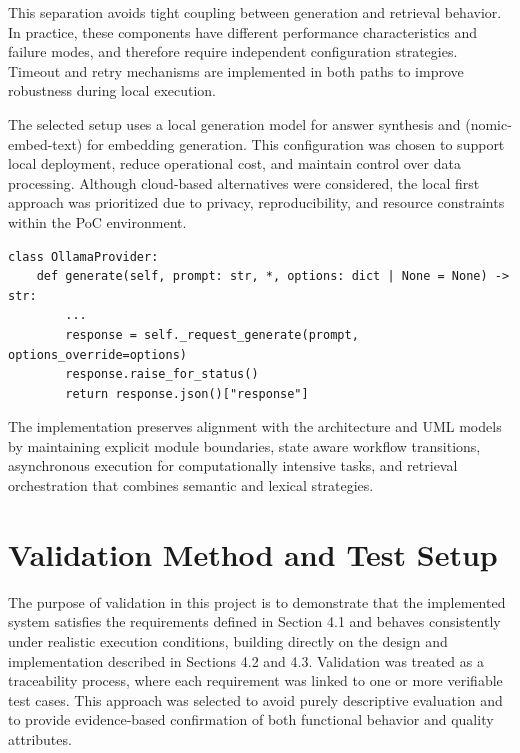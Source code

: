 \vspace{0.4cm}

This separation avoids tight coupling between generation and retrieval behavior.  
In practice, these components have different performance characteristics and failure modes, and therefore require independent configuration strategies.
Timeout and retry mechanisms are implemented in both paths to improve robustness during local execution.

\vspace{0.4cm}

The selected setup uses a local generation model for answer synthesis and (nomic-embed-text) for embedding generation.
This configuration was chosen to support local deployment, reduce operational cost, and maintain control over data processing.  
Although cloud-based alternatives were considered, the local first approach was prioritized due to privacy, reproducibility, and resource constraints within the PoC environment.

\begin{listing}[H]
\begin{verbatim}
class OllamaProvider:
    def generate(self, prompt: str, *, options: dict | None = None) -> str:
        ...
        response = self._request_generate(prompt, options_override=options)
        response.raise_for_status()
        return response.json()["response"]
\end{verbatim}
\caption{Generation integration via configurable Ollama provider abstraction.}
\label{code:ollama-provider-generate}
\end{listing}

The implementation preserves alignment with the architecture and UML models by maintaining explicit module boundaries, state aware workflow transitions, asynchronous execution for computationally intensive tasks, and retrieval orchestration that combines semantic and lexical strategies.



\vspace{1cm}

\section{Validation Method and Test Setup}

The purpose of validation in this project is to demonstrate that the implemented system satisfies the requirements defined in Section 4.1 and behaves consistently under realistic execution conditions, building directly on the design and implementation described in Sections 4.2 and 4.3. Validation was treated as a traceability process, where each requirement was linked to one or more verifiable test cases. This approach was selected to avoid purely descriptive evaluation and to provide evidence-based confirmation of both functional behavior and quality attributes.

